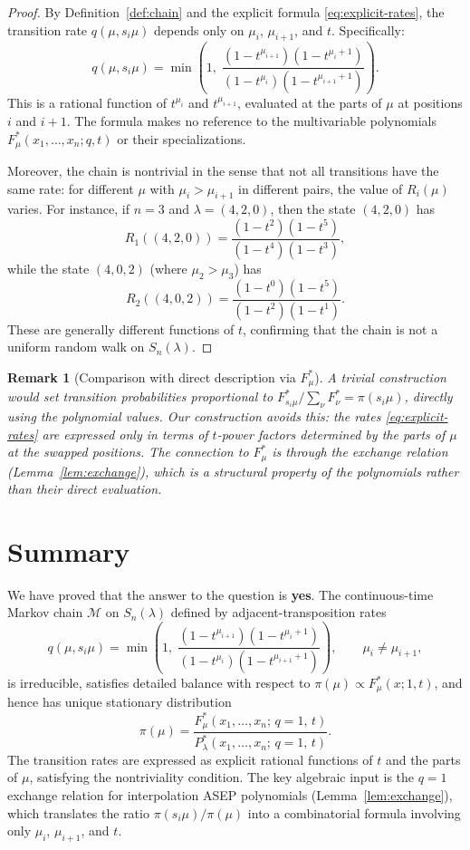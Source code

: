 \documentclass[12pt]{article}
\newtheorem{remark}[theorem]{Remark}
\begin{document}
\begin{proof}
By Definition~\ref{def:chain} and the explicit formula \eqref{eq:explicit-rates}, the transition rate $q(\mu, s_i\mu)$ depends only on $\mu_i$, $\mu_{i+1}$, and $t$. Specifically:
\[
q(\mu, s_i\mu) = \min\!\left(1,\; \frac{(1-t^{\mu_{i+1}})(1-t^{\mu_i+1})}{(1-t^{\mu_i})(1-t^{\mu_{i+1}+1})}\right).
\]
This is a rational function of $t^{\mu_i}$ and $t^{\mu_{i+1}}$, evaluated at the parts of $\mu$ at positions $i$ and $i+1$. The formula makes no reference to the multivariable polynomials $F^*_\mu(x_1,\dots,x_n;q,t)$ or their specializations.

Moreover, the chain is nontrivial in the sense that not all transitions have the same rate: for different $\mu$ with $\mu_i > \mu_{i+1}$ in different pairs, the value of $R_i(\mu)$ varies. For instance, if $n = 3$ and $\lambda = (4, 2, 0)$, then the state $(4,2,0)$ has
\[
R_1((4,2,0)) = \frac{(1-t^2)(1-t^5)}{(1-t^4)(1-t^3)},
\]
while the state $(4,0,2)$ (where $\mu_2 > \mu_3$) has
\[
R_2((4,0,2)) = \frac{(1-t^0)(1-t^5)}{(1-t^2)(1-t^1)}.
\]
These are generally different functions of $t$, confirming that the chain is not a uniform random walk on $S_n(\lambda)$.
\end{proof}

\begin{remark}[Comparison with direct description via $F^*_\mu$]
A trivial construction would set transition probabilities proportional to $F^*_{s_i\mu}/\sum_\nu F^*_\nu = \pi(s_i\mu)$, directly using the polynomial values. Our construction avoids this: the rates \eqref{eq:explicit-rates} are expressed only in terms of $t$-power factors determined by the parts of $\mu$ at the swapped positions. The connection to $F^*_\mu$ is through the exchange relation (Lemma~\ref{lem:exchange}), which is a structural property of the polynomials rather than their direct evaluation.
\end{remark}

\section{Summary}

We have proved that the answer to the question is \textbf{yes}. The continuous-time Markov chain $\mathcal{M}$ on $S_n(\lambda)$ defined by adjacent-transposition rates
\[
q(\mu, s_i\mu) = \min\!\left(1,\; \frac{(1-t^{\mu_{i+1}})(1-t^{\mu_i+1})}{(1-t^{\mu_i})(1-t^{\mu_{i+1}+1})}\right), \qquad \mu_i \neq \mu_{i+1},
\]
is irreducible, satisfies detailed balance with respect to $\pi(\mu) \propto F^*_\mu(x;1,t)$, and hence has unique stationary distribution
\[
\pi(\mu) = \frac{F^*_\mu(x_1,\dots,x_n;\,q=1,\,t)}{P^*_\lambda(x_1,\dots,x_n;\,q=1,\,t)}.
\]
The transition rates are expressed as explicit rational functions of $t$ and the parts of $\mu$, satisfying the nontriviality condition. The key algebraic input is the $q=1$ exchange relation for interpolation ASEP polynomials (Lemma~\ref{lem:exchange}), which translates the ratio $\pi(s_i\mu)/\pi(\mu)$ into a combinatorial formula involving only $\mu_i$, $\mu_{i+1}$, and $t$.
\end{document}
